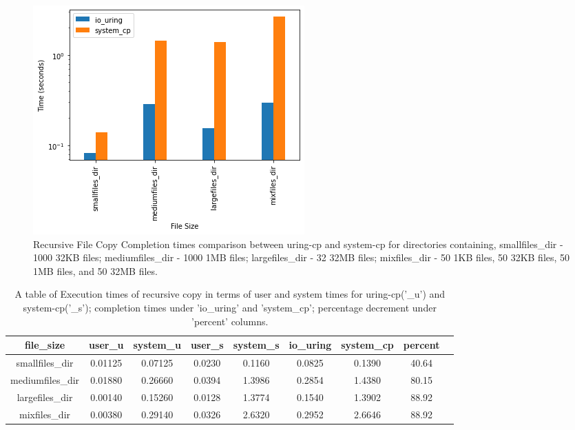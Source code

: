 \documentclass{article}
\begin{document}
\begin{figure}
    \centering
    \includegraphics[scale = 0.6]{cp_perf_recursive_compare.png}
    \caption{Recursive File Copy Completion times comparison between uring-cp and system-cp for directories containing, 
    smallfiles\_dir - 1000 32KB files; 
    mediumfiles\_dir - 1000 1MB files; 
    largefiles\_dir - 32 32MB files; 
    mixfiles\_dir - 50 1KB files, 50 32KB files, 50 1MB files, and 50 32MB files.}
    \label{Figure7}
\end{figure}

\begin{table}
\centering
\begin{tabular}{|c|c|c|c|c|c|c|c|c|}

    \hline
    file\_size & user\_u & system\_u & user\_s & system\_s & io\_uring & system\_cp & percent \\
    \hline                                                                                        
    smallfiles\_dir  &0.01125 & 0.07125& 0.0230 &  0.1160  & 0.0825 &   0.1390  &  40.64\\
    \hline                                                                                        
    mediumfiles\_dir &0.01880 & 0.26660& 0.0394 &  1.3986  & 0.2854 &   1.4380  &  80.15\\
    \hline                                                                                        
    largefiles\_dir  &0.00140 & 0.15260& 0.0128 &  1.3774  & 0.1540 &   1.3902  &  88.92\\
    \hline                                                                                        
    mixfiles\_dir    &0.00380 & 0.29140& 0.0326 &  2.6320  & 0.2952 &   2.6646  &  88.92\\
    \hline                                                                                        
     
\end{tabular}
\caption{\label{tab:widgets}A table of Execution times of recursive copy 
in terms of user and system times for uring-cp('\_u') 
and system-cp('\_s'); completion times under 'io\_uring' and 'system\_cp'; percentage decrement under 
'percent' columns.}
\vspace{0.5cm}
\end{table}
\end{document}
